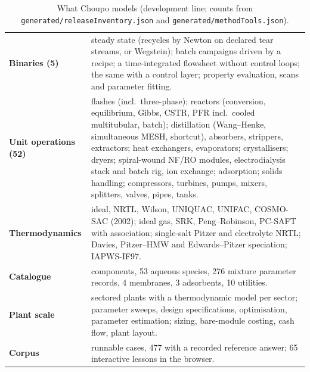 \documentclass[preprint,12pt]{elsarticle}
\begin{document}
\begin{table}[!t]
\centering\scriptsize
\caption{What Choupo models (development line; counts from
\texttt{generated/releaseInventory.json} and
\texttt{generated/methodTools.json}).}
\label{tab:scope}
\renewcommand{\arraystretch}{1.12}
\begin{tabularx}{\linewidth}{>{\raggedright\arraybackslash}p{3.1cm}
                             >{\raggedright\arraybackslash}X}
\toprule
\textbf{Binaries (5)} & steady state (recycles by Newton on declared tear
  streams, or Wegstein); batch campaigns driven by a recipe; a
  time-integrated flowsheet without control loops; the same with a control
  layer; property evaluation, scans and parameter fitting. \\
\textbf{Unit operations (52)} & flashes (incl.\ three-phase); reactors
  (conversion, equilibrium, Gibbs, CSTR, PFR incl.\ cooled multitubular,
  batch); distillation (Wang--Henke, simultaneous MESH, shortcut),
  absorbers, strippers, extractors; heat exchangers, evaporators;
  crystallisers; dryers; spiral-wound NF/RO modules, electrodialysis stack
  and batch rig, ion exchange; adsorption; solids handling; compressors,
  turbines, pumps, mixers, splitters, valves, pipes, tanks. \\
\textbf{Thermodynamics} & ideal, NRTL, Wilson, UNIQUAC, UNIFAC, COSMO-SAC
  (2002); ideal gas, SRK, Peng--Robinson, PC-SAFT with association;
  single-salt Pitzer and electrolyte NRTL; Davies, Pitzer--HMW and
  Edwards--Pitzer speciation; IAPWS-IF97. \\
\textbf{Catalogue} & 604 components, 53 aqueous species, 276 mixture
  parameter records, 4 membranes, 3 adsorbents, 10 utilities. \\
\textbf{Plant scale} & sectored plants with a thermodynamic model per
  sector; parameter sweeps, design specifications, optimisation, parameter
  estimation; sizing, bare-module costing, cash flow, plant layout. \\
\textbf{Corpus} & 494 runnable cases, 477 with a recorded reference
  answer; 65 interactive lessons in the browser. \\
\bottomrule
\end{tabularx}
\end{table}
\end{document}

